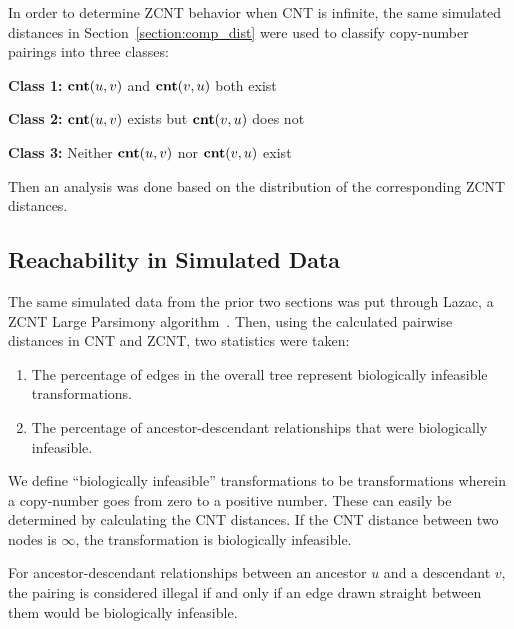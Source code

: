 In order to determine ZCNT behavior when CNT is infinite, the same simulated distances in Section~\ref{section:comp_dist} were used to classify copy-number pairings into three classes: 


{\bf Class 1:} $\textbf{cnt}(u, v)$ and $\textbf{cnt}(v, u)$ both exist

{\bf Class 2:} $\textbf{cnt}(u, v)$ exists but $\textbf{cnt}(v, u)$ does not 

{\bf Class 3:} Neither $\textbf{cnt}(u, v)$ nor $\textbf{cnt}(v, u)$ exist 

Then an analysis was done based on the distribution of the corresponding ZCNT distances. 


\subsection{Reachability in Simulated Data}\label{section:simulated_reachability}
The same simulated data from the prior two sections was put through Lazac, a ZCNT Large Parsimony algorithm~\cite{zcnt_paper}. Then, using the calculated pairwise distances in CNT and ZCNT, two statistics were taken: 

\begin{enumerate}
    \item The percentage of edges in the overall tree represent biologically infeasible transformations.
    \item The percentage of ancestor-descendant relationships that were biologically infeasible.
\end{enumerate}

We define ``biologically infeasible'' transformations to be transformations wherein a copy-number goes from zero to a positive number. These can easily be determined by calculating the CNT distances. If the CNT distance between two nodes is $\infty$, the transformation is biologically infeasible. 

For ancestor-descendant relationships between an ancestor $u$ and a descendant $v$, the pairing is considered illegal if and only if an edge drawn straight between them would be biologically infeasible.
